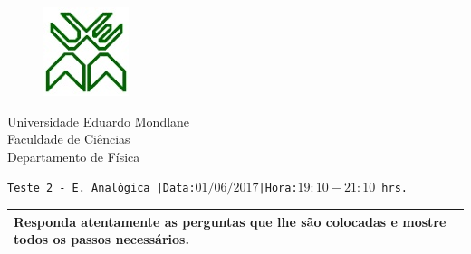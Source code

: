 \documentclass[11pt,a4paper,twoside]{report}
\author{Bartolomeu J. Ubisse}
\begin{document}
\begin{figure}[htb]

\centering
\includegraphics[scale=1]{UEM-logotipo}
\end{figure}
\centering
{ \Large Universidade Eduardo Mondlane}\\[0.3cm] 
\large Faculdade de Ci\^encias\\[0.2cm]
 \large Departamento de F\'isica\\[0.5cm]

\begin{flushleft}
\tt Teste 2 - E. Anal\'ogica\hspace{0.25cm} |Data:$01/06/2017$\hspace{0.25cm}|Hora:$19:10-21:10$ hrs.\\
\hrulefill
 \begin{table}[htb]
\centering
\begin{tabular}{p{16.55cm}}
\hline
\cellcolor[gray]{0.95}
Responda atentamente as perguntas que lhe s\~ao colocadas e mostre todos os passos necess\'arios.\\

 \hline
\end{tabular}
\end{table}
\end{flushleft}
\end{document}
